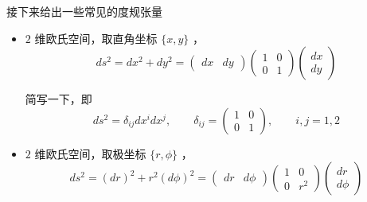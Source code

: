 接下来给出一些常见的度规张量
\begin{itemize}
    \item $2$ 维欧氏空间，取直角坐标 $\{x,y\}$ ，
    \begin{equation}
        ds^2 = dx^2 + dy^2 =
        \begin{pmatrix}
            dx & dy
        \end{pmatrix}
        \begin{pmatrix}
            1 & 0\\
            0 & 1
        \end{pmatrix}
        \begin{pmatrix}
            dx\\
            dy
        \end{pmatrix}
    \end{equation}

    简写一下，即
    \begin{equation}
        ds^2 = 
        \delta_{ij} dx^i dx^j   ,\qquad
        \delta_{ij} = 
        \begin{pmatrix}
            1 & 0\\
            0 & 1
        \end{pmatrix}
        ,\qquad i,j = 1,2
    \end{equation}
    \item $2$ 维欧氏空间，取极坐标 $\{r,\phi\}$ ，
    \begin{equation}
        ds^2 = (dr)^2 + r^2(d\phi)^2 =
        \begin{pmatrix}
            dr & d\phi
        \end{pmatrix}
        \begin{pmatrix}
            1 & 0\\
            0 & r^2
        \end{pmatrix}
        \begin{pmatrix}
            dr\\
            d\phi
        \end{pmatrix}
    \end{equation}


\end{itemize}
